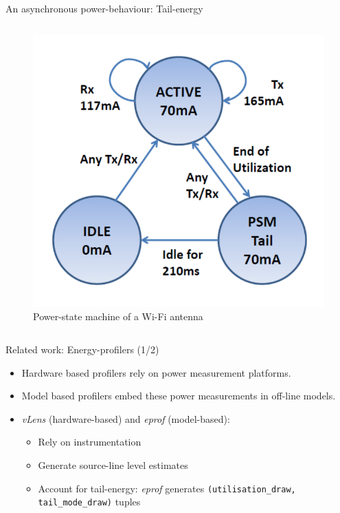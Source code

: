 \begin{frame}{An asynchronous power-behaviour: Tail-energy}
\begin{columns}
\begin{column}{0.5\textwidth}
\begin{figure}
	\centering
	\includegraphics[width=\textwidth]{figures/wifi_statemachine.png} 
	\caption{Power-state machine of a Wi-Fi antenna  \cite{Ding:2013:CMI:2465529.2466586}}
\end{figure}
\end{column}
\end{columns}
\end{frame}
%
%
\begin{frame}{Related work: Energy-profilers (1/2)}
\begin{itemize}
\item \alert{Hardware based} profilers rely on power measurement platforms.
\item \alert{Model based} profilers embed these power measurements in off-line models.
\item \textit{vLens} \cite{li2013calculating} (hardware-based) and \textit{eprof} \cite{pathak2012energy} (model-based):
\begin{itemize}
\item Rely on instrumentation
\item Generate \alert{source-line level estimates}
\item Account for \alert{tail-energy}: \textit{eprof} generates \texttt{(utilisation\_draw, 
tail\_mode\_draw)} tuples
\end{itemize}
\end{itemize}
\end{frame}
